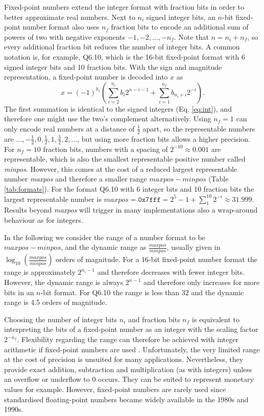 Fixed-point numbers extend the integer format with fraction bits in order to better approximate real numbers. 
Next to $n_i$ signed integer bits, an $n$-bit fixed-point number format also uses $n_f$ fraction bits to encode 
an additional sum of powers of two with negative exponents $-1,-2,...,-n_f$. Note that $n = n_i + n_f$, so
every additional fraction bit reduces the number of integer bits. A common notation is, for example,
Q6.10, which is the 16-bit fixed-point format with 6 signed integer bits and 10 fraction bits.
With the sign and magnitude representation, a fixed-point number is decoded into $x$ as
\begin{equation}
x = (-1)^{b_1} \left( \sum_{i=2}^{n_i} b_i 2^{n-i-1}  + \sum_{i=1}^{n_f} b_{n_i+i} 2^{-i} \right).
\label{eq:fixpoints}
\end{equation}
The first summation is identical to the signed integers (Eq. \ref{eq:int}), and therefore one might use the two's complement
alternatively. Using $n_f = 1$ can only encode real numbers at a distance of $\tfrac{1}{2}$ apart, so the representable
numbers are $..., -\tfrac{1}{2}, 0,\tfrac{1}{2},1,\tfrac{3}{2},2,...$, but using more fraction bits allows a higher precision.
For $n_f=10$ fraction bits, numbers with a spacing of $2^{-10} \approx 0.001$ are representable,
which is also the smallest representable positive number called \emph{minpos}. However, this comes at the cost of a reduced
largest representable number \emph{maxpos} and therefore a smaller range $maxpos-minpos$ (Table \ref{tab:formats}).
For the format Q6.10 with 6 integer bits and 10 fraction bits the largest representable number is $maxpos = \mathtt{0x7fff} = 2^5-1 + \sum_1^{10} 2^{-i}
\approx 31.999$. Results beyond \emph{maxpos} will trigger in many implementations also a wrap-around behaviour as for integers.

In the following we consider the range of a number format to be $maxpos-minpos$, and the dynamic range as
$\tfrac{maxpos}{minpos}$, usually given in $\log_{10}(\tfrac{maxpos}{minpos})$ orders of magnitude. For a 16-bit fixed-point
number format the range is approximately $2^{n_i-1}$ and therefore decreases with fewer integer bits.
However, the dynamic range is always $2^{n-1}$ and therefore only increases for more bits in an $n$-bit format. For Q6.10
the range is less than $32$ and the dynamic range is 4.5 orders of magnitude.

Choosing the number of integer bits $n_i$ and fraction bits $n_f$ is equivalent to interpreting the bits of a fixed-point number
as an integer with the scaling factor $2^{-n_f}$. Flexibility regarding the range can therefore be achieved with
integer arithmetic if fixed-point numbers are used \citep{Russell2017}. Unfortunately, the very limited range at the cost of precision 
is unsuited for many applications. Nevertheless, they provide exact addition, subtraction and multiplication (as with integers) unless an
overflow or underflow to 0 occurs. They can be suited to represent monetary values for example. However, fixed-point numbers
are rarely used since standardised floating-point numbers became widely available in the 1980s and 1990s.

